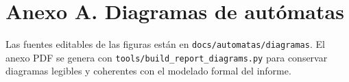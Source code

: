 \documentclass[11pt,a4paper]{article}
\begin{document}
\clearpage
\section*{Anexo A. Diagramas de autómatas}
Las fuentes editables de las figuras están en
\verb|docs/automatas/diagramas|. El anexo PDF se genera con
\verb|tools/build_report_diagrams.py| para conservar diagramas legibles y
coherentes con el modelado formal del informe.
\end{document}
